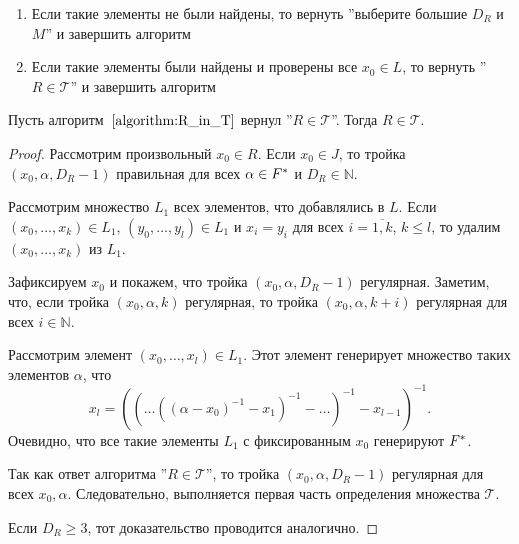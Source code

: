 \documentclass[_00_dissertation.tex]{subfiles}
\begin{document}
\begin{algorithm}
\begin{enumerate}
\begin{enumerate}
            \item Если такие элементы не были найдены, то вернуть ''выберите большие $D_R$ и $M$'' и завершить алгоритм
            
            \item Если такие элементы были найдены и проверены все $x_0 \in L$, то вернуть ''$R \in \mathcal{T}$'' и завершить алгоритм
        \end{enumerate}
    \end{enumerate}
\end{algorithm}

\begin{proposition}
    Пусть алгоритм~$\ref{algorithm:R_in_T}$ вернул ''$R \in \mathcal{T}$''.
    Тогда $R \in \mathcal{T}$.
\end{proposition}
\begin{proof}
    Рассмотрим произвольный $x_0 \in R$.
    Если $x_0 \in J$, то тройка $(x_0, \alpha, D_R - 1)$ правильная для всех $\alpha \in F^{*}$ и $D_R \in \mathbb{N}$.

    Рассмотрим множество $L_1$ всех элементов, что добавлялись в $L$.
    Если $(x_0, \ldots, x_k) \in L_1$, $(y_0, \ldots, y_l) \in L_1$ и $x_i = y_i$ для всех $i = \overline{1, k}$, $k \le l$, то удалим $(x_0, \ldots, x_k)$ из $L_1$.

    Зафиксируем $x_0$ и покажем, что тройка $(x_0, \alpha, D_R - 1)$ регулярная.
    Заметим, что, если тройка $(x_0, \alpha, k)$ регулярная, то тройка $(x_0, \alpha, k + i)$ регулярная для всех $i \in \mathbb{N}$.

    Рассмотрим элемент $(x_0, \ldots, x_l) \in L_1$.
    Этот элемент генерирует множество таких элементов $\alpha$, что
    \begin{equation*}
        x_l = \left(
            \left(
                \ldots \left(
                    \left(
                        \alpha - x_0
                    \right)^{-1} - x_1
                \right)^{-1} - \ldots
            \right)^{-1} - x_{l-1}
        \right)^{-1}.
    \end{equation*}
    Очевидно, что все такие элементы $L_1$ с фиксированным $x_0$ генерируют $F^{*}$.
    
    Так как ответ алгоритма ''$R \in \mathcal{T}$'', то тройка $(x_0, \alpha, D_R - 1)$ регулярная для всех $x_0, \alpha$.
    Следовательно, выполняется первая часть определения множества $\mathcal{T}$.
    
    Если $D_R \ge 3$, тот доказательство проводится аналогично.
\end{proof}
\end{document}
